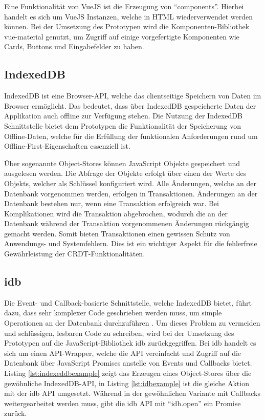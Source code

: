 \documentclass[a4paper, 12pt]{scrreprt}
\begin{document}
Eine Funktionalität von VueJS ist die Erzeugung von \enquote{components}. Hierbei handelt es sich um VueJS Instanzen, welche in HTML wiederverwendet werden können. Bei der Umsetzung des Prototypen wird die Komponenten-Bibliothek vue-material genutzt, um Zugriff auf einige vorgefertigte Komponenten wie Cards, Buttons und Eingabefelder zu haben. 
\subsection{IndexedDB}
IndexedDB ist eine Browser-API, welche das clientseitige Speichern von Daten im Browser ermöglicht. Das bedeutet, dass über IndexedDB gespeicherte Daten der Applikation auch offline zur Verfügung stehen. Die Nutzung der IndexedDB Schnittstelle bietet dem Prototypen die Funktionalität der Speicherung von Offline-Daten, welche für die Erfüllung der funktionalen Anforderungen rund um Offline-First-Eigenschaften essenziell ist. 

Über sogenannte Object-Stores können JavaScript Objekte gespeichert und ausgelesen werden. Die Abfrage der Objekte erfolgt über einen der Werte des Objekts, welcher als Schlüssel konfiguriert wird. Alle Änderungen, welche an der Datenbank vorgenommen werden, erfolgen in Transaktionen. Änderungen an der Datenbank bestehen nur, wenn eine Transaktion erfolgreich war. Bei Komplikationen wird die Transaktion abgebrochen, wodurch die an der Datenbank während der Transaktion vorgenommenen Änderungen rückgängig gemacht werden. Somit bieten Transaktionen einen gewissen Schutz von Anwendungs- und Systemfehlern. Dies ist ein wichtiger Aspekt für die fehlerfreie Gewährleistung der CRDT-Funktionalitäten.
\subsection{idb}
\label{sec:idb}
Die Event- und Callback-basierte Schnittstelle, welche IndexedDB bietet, führt dazu, dass sehr komplexer Code geschrieben werden muss, um simple Operationen an der Datenbank durchzuführen \autocite{InproceedingsIDBdoof}. Um dieses Problem zu vermeiden und schlüssigen, lesbaren Code zu schreiben, wird bei der Umsetzung des Prototypen auf die JavaScript-Bibliothek idb zurückgegriffen. Bei idb handelt es sich um einen API-Wrapper, welche die API vereinfacht und Zugriff auf die Datenbank über JavaScript Promises anstelle von Events und Callbacks bietet. Listing \ref{lst:indexeddbexample} zeigt das Erzeugen eines Object-Stores über die gewöhnliche IndexedDB-API, in Listing \ref{lst:idbexample} ist die gleiche Aktion mit der idb API umgesetzt. Während in der gewöhnlichen Variante mit Callbacks weitergearbeitet werden muss, gibt die idb API mit \enquote{idb.open} ein Promise zurück.
\end{document}
